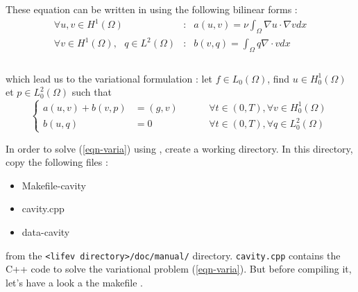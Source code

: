 These equation can be written in using the following bilinear forms :
\begin{eqnarray*}
\displaystyle \forall u,v \in H^1(\Omega) & : &
a(u,v) = \nu \int_{\Omega}\nabla u \cdot \nabla v dx \\
\displaystyle \forall v \in H^1(\Omega),\mbox{ } q \in L^2(\Omega) & : &
b(v,q) = \int_{\Omega} q\nabla \cdot v dx \\
\end{eqnarray*}\\
which lead us to the variational formulation : let $f
\in L_0(\Omega)$, find $u \in H^1_0(\Omega)$ et $p \in
L^2_0(\Omega)$ such that
\begin{equation} \label{eqn-varia}
\left\{
\begin{array}{rlr}
\displaystyle a(u,v) + b(v,p) & =  (g,v)
& \hspace{1cm} \forall t \in(0,T), \forall v \in H^1_0(\Omega) \\
b(u,q) & = 0 & \hspace{1cm} \forall t \in (0,T), \forall q \in L^2_0(\Omega)
\end{array}
\right.
\end{equation}

In order to solve (\ref{eqn-varia}) using \lifev, create a working directory.
In this directory, copy the following files :

\begin{itemize}
\item Makefile-cavity
\item cavity.cpp
\item data-cavity
\end{itemize}

from the \verb|<lifev directory>/doc/manual/| directory. \verb!cavity.cpp! contains the
C++ code to solve the variational problem (\ref{eqn-varia}). But before compiling it,
let's have a look a the makefile .

